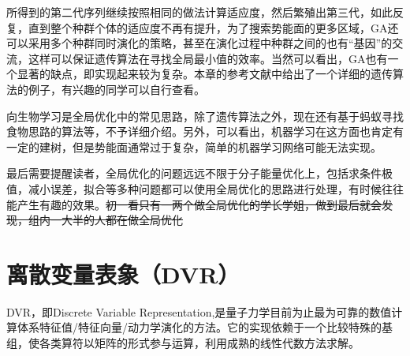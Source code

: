 \documentclass[12pt,a4paper,openany,twoside]{book}
\numberwithin{equation}{section}
\begin{document}
        所得到的第二代序列继续按照相同的做法计算适应度，然后繁殖出第三代，如此反复，直到整个种群个体的适应度不再有提升，为了搜索势能面的更多区域，GA还可以采用多个种群同时演化的策略，甚至在演化过程中种群之间的也有“基因”的交流，这样可以保证遗传算法在寻找全局最小值的效率。当然可以看出，GA也有一个显著的缺点，即实现起来较为复杂。本章的参考文献中给出了一个详细的遗传算法的例子，有兴趣的同学可以自行查看。

        向生物学习是全局优化中的常见思路，除了遗传算法之外，现在还有基于蚂蚁寻找食物思路的算法等，不予详细介绍。另外，可以看出，机器学习在这方面也肯定有一定的建树，但是势能面通常过于复杂，简单的机器学习网络可能无法实现。

        最后需要提醒读者，全局优化的问题远远不限于分子能量优化上，包括求条件极值，减小误差，拟合等多种问题都可以使用全局优化的思路进行处理，有时候往往能产生有趣的效果。\sout{初一看只有一两个做全局优化的学长学姐，做到最后就会发现，组内一大半的人都在做全局优化}


    \chapter{离散变量表象（DVR）}

      DVR，即Discrete Variable Representation,是量子力学目前为止最为可靠的数值计算体系特征值/特征向量/动力学演化的方法。它的实现依赖于一个比较特殊的基组，使各类算符以矩阵的形式参与运算，利用成熟的线性代数方法求解。
\end{document}

